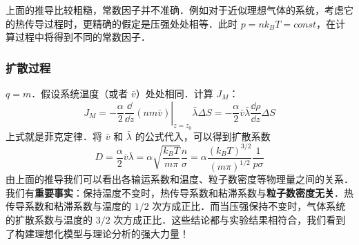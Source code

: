 上面的推导比较粗糙，常数因子并不准确．例如对于近似理想气体的系统，考虑它的热传导过程时，更精确的假定是压强处处相等．此时 $p=nk_BT=const$，在计算过程中将得到不同的常数因子．
\subsubsection{扩散过程}
$q=m$．假设系统温度（或者 $\bar v$）处处相同．计算 $J_M$：
\begin{equation}
J_M=-\frac{\alpha}{2}\left.\frac{\dd }{\dd z}(nm\bar v)\right|_{z=z_0}\bar\lambda \Delta S = -\frac{\alpha}{2}\bar v\bar\lambda \frac{\dd \rho}{\dd z}\Delta S
\end{equation}
上式就是菲克定律．将 $\bar v$ 和 $\bar\lambda$ 的公式代入，可以得到扩散系数
\begin{equation}
D=\frac{\alpha}{2}\bar v\bar \lambda = \alpha\sqrt{\frac{k_BT}{m\pi}}\frac{n}{\sigma} =  \alpha\frac{(k_B T)^{3/2}}{(m\pi)^{1/2}}\frac{1}{p\sigma}
\end{equation}
由上面的推导我们可以看出各输运系数和温度、粒子数密度等物理量之间的关系．我们有\textbf{重要事实}：保持温度不变时，热传导系数和粘滞系数与\textbf{粒子数密度无关}．热传导系数和粘滞系数与温度的 $1/2$ 次方成正比．而当压强保持不变时，气体系统的扩散系数与温度的 $3/2$ 次方成正比．这些结论都与实验结果相符合，我们看到了构建理想化模型与理论分析的强大力量！